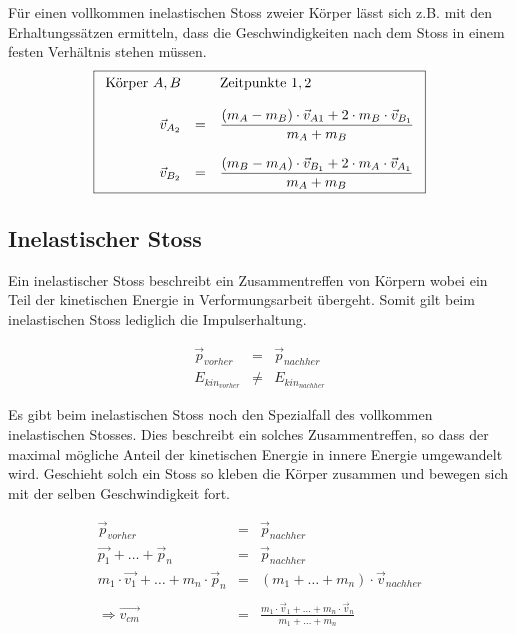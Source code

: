 \noindent
Für einen vollkommen inelastischen Stoss zweier Körper lässt sich z.B. mit
den Erhaltungssätzen ermitteln, dass die Geschwindigkeiten nach dem Stoss
in einem festen Verhältnis stehen müssen.
\[ \boxed{\begin{array}{r c l}
	\text{Körper } A,B & & \text{Zeitpunkte } 1,2  \\
	& & \\
	\vec{v}_{A_2} & = & \displaystyle
		\frac{(m_A-m_B)\cdot\vec{v}_{A1}
			+2\cdot m_B\cdot\vec{v}_{B_1}}
			{m_A + m_B} \\
	& & \\
	\vec{v}_{B_2} & = & \displaystyle
		\frac{(m_B-m_A)\cdot\vec{v}_{B_1}
			+2\cdot m_A \cdot \vec{v}_{A_1}}
			{m_A + m_B}
\end{array}} \]

\subsection{Inelastischer Stoss}
Ein inelastischer Stoss beschreibt ein Zusammentreffen von Körpern wobei ein
Teil der kinetischen Energie in Verformungsarbeit übergeht. Somit gilt beim
inelastischen Stoss lediglich die Impulserhaltung. 

\[ \boxed{
	\begin{array}{rcl}
		\vec{p}_{vorher} &= &\vec{p}_{nachher} \\
		E_{kin_{vorher}} &\neq &E_{kin_{nachher}}
	\end{array}
} \]

\noindent
Es gibt beim inelastischen Stoss noch den Spezialfall des vollkommen 
inelastischen Stosses. Dies beschreibt ein solches Zusammentreffen, so dass
der maximal mögliche Anteil der kinetischen Energie in innere Energie
umgewandelt wird. Geschieht solch ein Stoss so kleben die Körper zusammen
und bewegen sich mit der selben Geschwindigkeit fort.

\[ \boxed{
	\begin{array}{rcl}
		\vec{p}_{vorher} &= & \vec{p}_{nachher} \\
		\vec{p_1} + \dots + \vec{p}_n &= &\vec{p}_{nachher} \\
		m_1 \cdot \vec{v_1} + \dots + m_n \cdot \vec{p}_n&= 
			& (m_1 + \dots + m_n)\cdot \vec{v}_{nachher} \\
		 & & \\
		\Rightarrow \vec{v_{cm}} & = & \displaystyle 
			\frac{m_1\cdot\vec{v}_1+\dots+m_n\cdot\vec{v}_n}
				{m_1 + \dots + m_n}
	\end{array}
} \]

